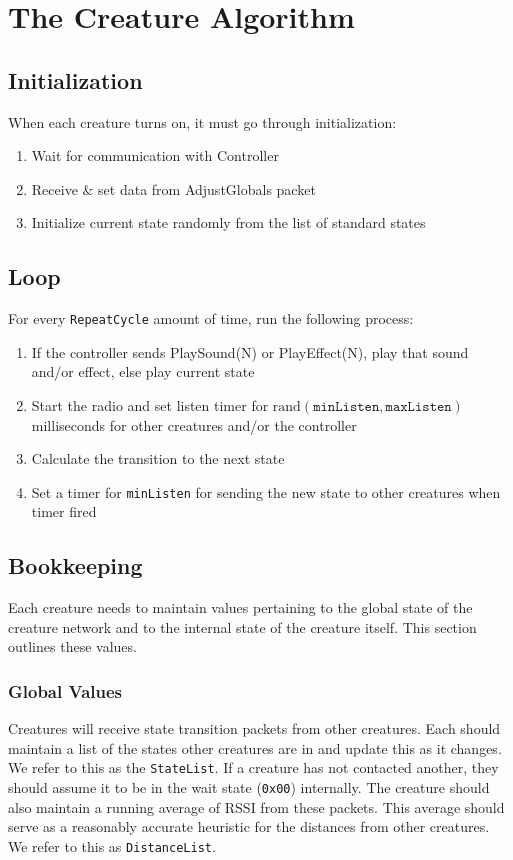 \documentclass{article}
\newcommand\code{\texttt}
\newcommand\hex[1]{\texttt{0x#1}}
\newcommand\rand{\text{rand}}
\begin{document}
\clearpage
\section{The Creature Algorithm}

\subsection{Initialization}
When each creature turns on, it must go through initialization:

\begin{enumerate}
    \item Wait for communication with Controller
    \item Receive \& set data from AdjustGlobals packet
    \item Initialize current state randomly from the list of standard states
\end{enumerate}

\subsection{Loop}
For every \code{RepeatCycle} amount of time, run the following process:
\begin{enumerate}
    \item If the controller sends PlaySound(N) or PlayEffect(N), play that sound and/or effect, else play current state
    \item Start the radio and set listen timer for $\rand(\code{minListen}, \code{maxListen})$ milliseconds for other creatures and/or the controller
    \item Calculate the transition to the next state
    \item Set a timer for \code{minListen} for sending the new state to other creatures when timer fired
\end{enumerate}


\subsection{Bookkeeping}
Each creature needs to maintain values pertaining to the global state of the creature network and to the internal state of the creature itself. This section outlines these values.

\subsubsection{Global Values}
Creatures will receive state transition packets from other creatures. Each should maintain a list of the states other creatures are in and update this as it changes. We refer to this as the \code{StateList}. If a creature has not contacted another, they should assume it to be in the wait state (\hex{00}) internally. The creature should also maintain a running average of RSSI from these packets. This average should serve as a reasonably accurate heuristic for the distances from other creatures. We refer to this as \code{DistanceList}.
\end{document}
